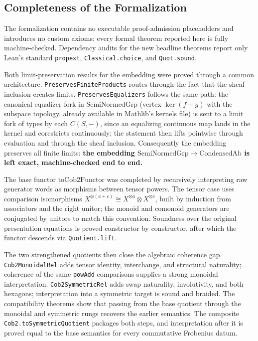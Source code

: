 \documentclass[11pt]{amsart}
\theoremstyle{plain}
\theoremstyle{definition}
\newcommand{\CondAb}{\mathrm{CondensedAb}}
\newcommand{\SemiNormedGrp}{\mathrm{SemiNormedGrp}}
\begin{document}
\subsection{Completeness of the Formalization}

The formalization contains no executable proof-admission placeholders and introduces no custom axioms: every formal theorem reported here is fully machine-checked. Dependency audits for the new headline theorems report only Lean's standard \texttt{propext}, \texttt{Classical.choice}, and \texttt{Quot.sound}.

Both limit-preservation results for the embedding were proved through a common architecture. \texttt{PreservesFiniteProducts} routes through the fact that the sheaf inclusion creates limits. \texttt{PreservesEqualizers} follows the same path: the canonical equalizer fork in $\SemiNormedGrp$ (vertex $\ker(f-g)$ with the subspace topology, already available in Mathlib's kernels file) is sent to a limit fork of types by each $C(S,-)$, since an equalizing continuous map lands in the kernel and corestricts continuously; the statement then lifts pointwise through evaluation and through the sheaf inclusion. Consequently the embedding preserves all finite limits: \textbf{the embedding $\SemiNormedGrp \to \CondAb$ is left exact, machine-checked end to end.}

The base functor $\mathrm{toCob2Functor}$ was completed by recursively interpreting raw generator words as morphisms between tensor powers. The tensor case uses comparison isomorphisms $X^{\otimes(a+c)} \cong X^{\otimes a}\otimes X^{\otimes c}$, built by induction from associators and the right unitor; the monoid and comonoid generators are conjugated by unitors to match this convention. Soundness over the original presentation equations is proved constructor by constructor, after which the functor descends via \texttt{Quotient.lift}.

The two strengthened quotients then close the algebraic coherence gap. \texttt{Cob2MonoidalRel} adds tensor identity, interchange, and structural naturality; coherence of the same \texttt{powAdd} comparisons supplies a strong monoidal interpretation. \texttt{Cob2SymmetricRel} adds swap naturality, involutivity, and both hexagons; interpretation into a symmetric target is sound and braided. The compatibility theorems show that passing from the base quotient through the monoidal and symmetric rungs recovers the earlier semantics. The composite \texttt{Cob2.toSymmetricQuotient} packages both steps, and interpretation after it is proved equal to the base semantics for every commutative Frobenius datum.
\end{document}
